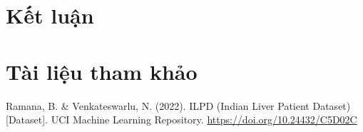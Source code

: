 \documentclass[14pt,a4paper]{extarticle}\usepackage[]{graphicx}\usepackage[]{xcolor}
\begin{document}

\section{Kết luận}


\section{Tài liệu tham khảo}

Ramana, B. \& Venkateswarlu, N. (2022). ILPD (Indian Liver Patient Dataset)
[Dataset]. UCI Machine Learning Repository.
\url{https://doi.org/10.24432/C5D02C}
\end{document}
